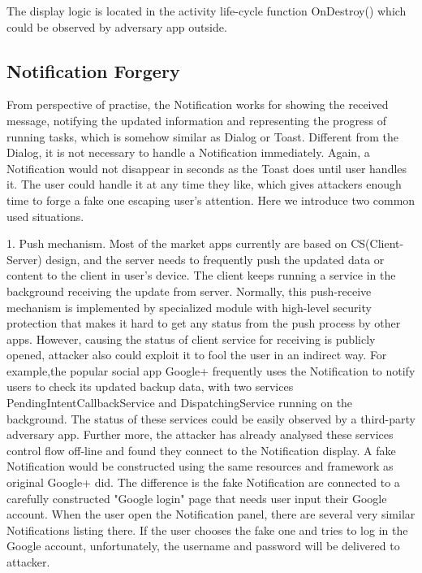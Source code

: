 \documentclass{sig-alternate-05-2015}
\begin{document}
The display logic is located in the activity life-cycle function OnDestroy() which could be observed by adversary app outside. 

\subsection{Notification Forgery}
From perspective of practise, the Notification works for showing the received message, notifying the updated information and representing the progress of running tasks, which is somehow similar as Dialog or Toast. Different from the Dialog, it is not necessary to handle a Notification immediately. Again, a Notification would not disappear in seconds as the Toast does until user handles it. The user could handle it at any time they like, which gives attackers enough time to forge a fake one escaping user's attention. Here we introduce two common used situations. 

1. Push mechanism. Most of the market apps currently are based on CS(Client-Server) design, and the server needs to frequently push the updated data or content to the client in user's device. The client keeps running a service in the background receiving the update from server. Normally, this push-receive mechanism is implemented by specialized module with high-level security protection that makes it hard to get any status from the push process by other apps. However, causing the status of client service for receiving is publicly opened, attacker also could exploit it to fool the user in an indirect way. For example,the popular social app Google+ frequently uses the Notification to notify users to check its updated backup data, with two services PendingIntentCallbackService and DispatchingService running on the background. The status of these services could be easily observed by a third-party adversary app. Further more, the attacker has already analysed these services control flow off-line and found they connect to the Notification display. A fake Notification would be constructed using the same resources and framework as original Google+ did. The difference is the fake Notification are connected to a carefully constructed "Google login" page that needs user input their Google account. When the user open the Notification panel, there are several very similar Notifications listing there. If the user chooses the fake one and tries to log in the Google account, unfortunately, the username and password will be delivered to attacker.
\end{document}
